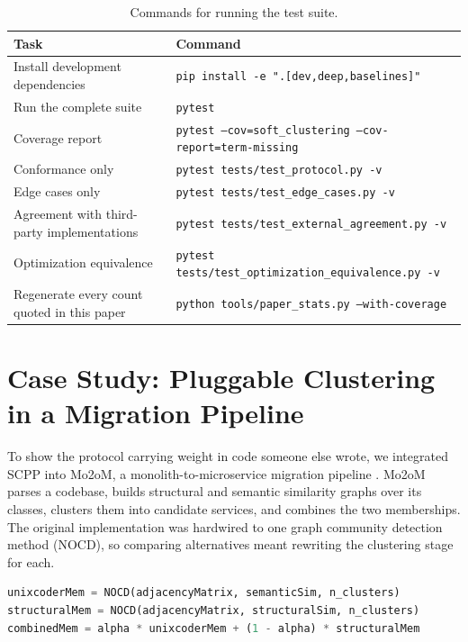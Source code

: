 \documentclass[twoside,11pt]{article}
\begin{document}
\begin{table}[h!]
\centering
\caption{Commands for running the test suite.}
\label{tab:testing_commands}
\begin{tabular}{p{5.2cm} p{9.5cm}}
\toprule
\textbf{Task} & \textbf{Command} \\
\midrule
Install development dependencies & \texttt{pip install -e ".[dev,deep,baselines]"} \\
Run the complete suite & \texttt{pytest} \\
Coverage report & \texttt{pytest --cov=soft\_clustering --cov-report=term-missing} \\
Conformance only & \texttt{pytest tests/test\_protocol.py -v} \\
Edge cases only & \texttt{pytest tests/test\_edge\_cases.py -v} \\
Agreement with third-party implementations & \texttt{pytest tests/test\_external\_agreement.py -v} \\
Optimization equivalence & \texttt{pytest tests/test\_optimization\_equivalence.py -v} \\
Regenerate every count quoted in this paper & \texttt{python tools/paper\_stats.py --with-coverage} \\
\bottomrule
\end{tabular}
\end{table}

\section{Case Study: Pluggable Clustering in a Migration Pipeline}\label{appendix:mo2om}

To show the protocol carrying weight in code someone else wrote, we integrated
SCPP into Mo2oM, a monolith-to-microservice migration pipeline
\citep{ziabakhsh2025extracting}. Mo2oM parses a codebase, builds structural
and semantic similarity graphs over its classes, clusters them into candidate
services, and combines the two memberships. The original implementation was
hardwired to one graph community detection method (NOCD), so comparing
alternatives meant rewriting the clustering stage for each.

\begin{lstlisting}[language=Python, caption={Before: the method is part of the pipeline.}]
unixcoderMem = NOCD(adjacencyMatrix, semanticSim, n_clusters)
structuralMem = NOCD(adjacencyMatrix, structuralSim, n_clusters)
combinedMem = alpha * unixcoderMem + (1 - alpha) * structuralMem
\end{lstlisting}
\end{document}
